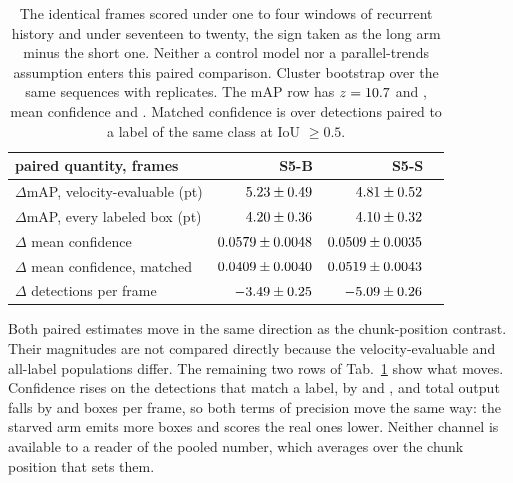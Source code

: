 \documentclass[10pt,twocolumn,letterpaper]{article}
\begin{document}
\begin{table}[h]
\centering\footnotesize
\setlength{\tabcolsep}{3.0pt}\renewcommand{\arraystretch}{0.95}
\begin{tabular}{lrrr}
\toprule
paired quantity, \ssmPairedN{} frames & S5-B & S5-S \\
\midrule
$\Delta$mAP, velocity-evaluable (pt) & $5.23\pm0.49$ & $4.81\pm0.52$ \\
$\Delta$mAP, every labeled box (pt) & $4.20\pm0.36$ & $4.10\pm0.32$ \\
$\Delta$ mean confidence & $0.0579\pm0.0048$ & $0.0509\pm0.0035$ \\
$\Delta$ mean confidence, matched & $0.0409\pm0.0040$ & $0.0519\pm0.0043$ \\
$\Delta$ detections per frame & $-3.49\pm0.25$ & $-5.09\pm0.26$ \\
\bottomrule
\end{tabular}
\caption{The identical frames scored under one to four windows of recurrent history and
under seventeen to twenty, the sign taken as the long arm minus the short one. Neither a
control model nor a parallel-trends assumption enters this paired comparison. Cluster bootstrap over the same
\outSeqsScanned{} sequences with \ssmPairedB{} replicates. The mAP row has
$z=10.7{}$ and \ssmPairedMapVelSmallZ{}, mean confidence
\ssmPairedConfBaseZ{} and \ssmPairedConfSmallZ{}. Matched confidence is over detections paired to a label of the same
class at IoU $\ge 0.5$.}
\label{tab:paired}
\end{table}

Both paired estimates move in the same direction as the chunk-position contrast. Their magnitudes
are not compared directly because the velocity-evaluable and all-label populations differ.
The remaining two rows of Tab.~\ref{tab:paired} show what moves. Confidence rises on the detections that
match a label, by \ssmPairedConfTpBase{} and \ssmPairedConfTpSmall{}, and total output
falls by \ssmPairedDpfBase{} and \ssmPairedDpfSmall{} boxes per frame, so both terms of
precision move the same way: the starved arm emits more boxes and scores the real ones
lower. Neither channel is available to a reader of the pooled number, which averages over
the chunk position that sets them.
\end{document}
